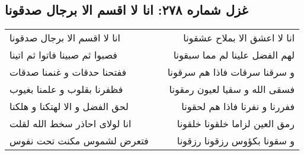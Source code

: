 \begin{center}
\section*{غزل شماره ۲۷۸: انا لا اقسم الا برجال صدقونا}
\label{sec:0278}
\begin{longtable}{l p{0.5cm} r}
انا لا اقسم الا برجال صدقونا
&&
انا لا اعشق الا بملاح عشقونا
\\
فصبوا ثم صبینا فاتوا ثم اتینا
&&
لهم الفضل علینا لم مما سبقونا
\\
ففتحنا حدقات و غنمنا صدقات
&&
و سرقنا سرقات فاذا هم سرقونا
\\
فظفرنا بقلوب و علمنا بغیوب
&&
فسقی الله و سقیا لعیون رمقونا
\\
لحق الفضل و الا لهتکنا و هلکنا
&&
ففررنا و نفرنا فاذا هم لحقونا
\\
انا لولای احاذر سخط الله لقلت
&&
رمق العین لزاما خلقونا خلقونا
\\
فتعرض لشموس مکنت تحت نفوس
&&
و سقونا بکؤوس رزقونا رزقونا
\\
\end{longtable}
\end{center}
